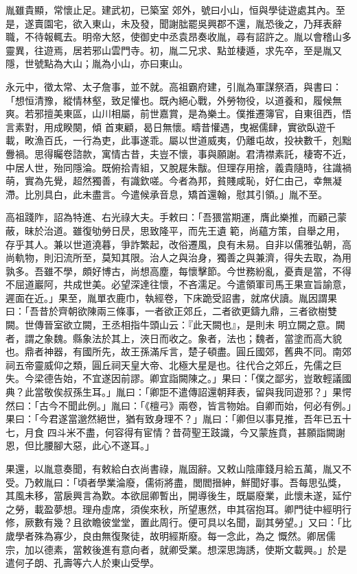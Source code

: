 \begin{pinyinscope}
 胤雖貴顯，常懷止足。建武初，已築室
 郊外，號曰小山，恒與學徒遊處其內。至是，遂賣園宅，欲入東山，未及發，聞謝朏罷吳興郡不還，胤恐後之，乃拜表辭職，不待報輒去。明帝大怒，使御史中丞袁昂奏收胤，尋有詔許之。胤以會稽山多靈異，往遊焉，居若邪山雲門寺。初，胤二兄求、點並棲遁，求先卒，至是胤又隱，世號點為大山；胤為小山，亦曰東山。



 永元中，徵太常、太子詹事，並不就。高祖霸府建，引胤為軍謀祭酒，與書曰：「想恒清豫，縱情林壑，致足懽也。既內絕心戰，外勞物役，以道養和，履候無爽。若邪擅美東區，山川相屬，前世嘉賞，是為樂土。僕推遷簿官，自東徂西，悟言素對，用成睽闋，傾
 首東顧，曷日無懷。疇昔懽遇，曳裾儒肆，實欲臥遊千載，畋漁百氏，一行為吏，此事遂乖。屬以世道威夷，仍離屯故，投袂數千，剋黜釁禍。思得矚卷諮款，寓情古昔，夫豈不懷，事與願謝。君清襟素託，棲寄不近，中居人世，殆同隱淪。既俯拾青組，又脫屣朱黻。但理存用捨，義貴隨時，往識禍萌，實為先覺，超然獨善，有識欽嗟。今者為邦，貧賤咸恥，好仁由己，幸無凝滯。比別具白，此未盡言。今遣候承音息，矯首還翰，慰其引領。」胤不至。



 高祖踐阼，詔為特進、右光祿大夫。手敕曰：「吾猥當期運，膺此樂推，而顧己蒙蔽，昧於治道。雖復劬勞日昃，思致隆平，而先王遺
 範，尚蘊方策，自舉之用，存乎其人。兼以世道澆暮，爭詐繁起，改俗遷風，良有未易。自非以儒雅弘朝，高尚軌物，則汩流所至，莫知其限。治人之與治身，獨善之與兼濟，得失去取，為用孰多。吾雖不學，頗好博古，尚想高塵，每懷擊節。今世務紛亂，憂責是當，不得不屈道巖阿，共成世美。必望深達往懷，不吝濡足。今遣領軍司馬王果宣旨諭意，遲面在近。」果至，胤單衣鹿巾，執經卷，下床跪受詔書，就席伏讀。胤因謂果曰：「吾昔於齊朝欲陳兩三條事，一者欲正郊丘，二者欲更鑄九鼎，三者欲樹雙闕。世傳晉室欲立闕，王丞相指牛頭山云：『此天闕也』，是則未
 明立闕之意。闕者，謂之象魏。縣象法於其上，浹日而收之。象者，法也；魏者，當塗而高大貌也。鼎者神器，有國所先，故王孫滿斥言，楚子頓盡。圓丘國郊，舊典不同。南郊祠五帝靈威仰之類，圓丘祠天皇大帝、北極大星是也。往代合之郊丘，先儒之巨失。今梁德告始，不宜遂因前謬。卿宜詣闕陳之。」果曰：「僕之鄙劣，豈敢輕議國典？此當敬俟叔孫生耳。」胤曰：「卿詎不遣傳詔還朝拜表，留與我同遊邪？」果愕然曰：「古今不聞此例。」胤曰：「《檀弓》兩卷，皆言物始。自卿而始，何必有例。」果曰：「今君遂當邈然絕世，猶有致身理不？」胤曰：「卿但以事見推，吾年已五十七，月食
 四斗米不盡，何容得有宦情？昔荷聖王跂識，今又蒙旌賁，甚願詣闕謝恩，但比腰腳大惡，此心不遂耳。」



 果還，以胤意奏聞，有敕給白衣尚書祿，胤固辭。又敕山陰庫錢月給五萬，胤又不受。乃敕胤曰：「頃者學業淪廢，儒術將盡，閭閻搢紳，鮮聞好事。吾每思弘獎，其風未移，當扆興言為歎。本欲屈卿暫出，開導後生，既屬廢業，此懷未遂，延佇之勞，載盈夢想。理舟虛席，須俟來秋，所望惠然，申其宿抱耳。卿門徒中經明行修，厥數有幾？且欲瞻彼堂堂，置此周行。便可具以名聞，副其勞望。」又曰：「比歲學者殊為寡少，良由無復聚徒，故明經斯廢。每一念此，為之
 慨然。卿居儒宗，加以德素，當敕後進有意向者，就卿受業。想深思誨誘，使斯文載興。」於是遣何子朗、孔壽等六人於東山受學。




\end{pinyinscope}
